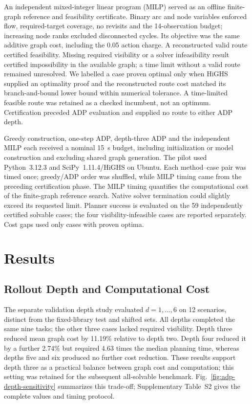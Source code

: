 \documentclass{IEEEtaes}
\newcommand{\unit}[2]{#1~#2}
\begin{document}
An independent mixed-integer linear program (MILP) served as an offline finite-graph reference and feasibility certificate. Binary arc and node variables enforced flow, required-target coverage, no revisits and the 14-observation budget; increasing node ranks excluded disconnected cycles. Its objective was the same additive graph cost, including the 0.05 action charge. A reconstructed valid route certified feasibility. Missing required visibility or a solver infeasibility result certified impossibility in the available graph; a time limit without a valid route remained unresolved. We labelled a case proven optimal only when HiGHS supplied an optimality proof and the reconstructed route cost matched its branch-and-bound lower bound within numerical tolerance. A time-limited feasible route was retained as a checked incumbent, not an optimum. Certification preceded ADP evaluation and supplied no route to either ADP depth.

Greedy construction, one-step ADP, depth-three ADP and the independent MILP each received a nominal \unit{15}{s} budget, including initialization or model construction and excluding shared graph generation. The pilot used Python~3.12.3 and SciPy~1.11.4/HiGHS on Ubuntu. Each method--case pair was timed once; greedy/ADP order was shuffled, while MILP timing came from the preceding certification phase. The MILP timing quantifies the computational cost of the finite-graph reference search. Native solver termination could slightly exceed its requested limit. Planner success is evaluated on the 59 independently certified solvable cases; the four visibility-infeasible cases are reported separately. Cost gaps used only cases with proven optima.

\section{Results}
\label{sec:results}

\subsection{Rollout Depth and Computational Cost}
\label{sec:depth-diagnostic}

The separate validation depth study evaluated $d=1,\ldots,6$ on 12 scenarios, distinct from the fixed-library test and shifted sets. All depths completed the same nine tasks; the other three cases lacked required visibility. Depth three reduced mean graph cost by 11.19\% relative to depth two. Depth four reduced it by a further 2.74\% but required 4.63 times the median planning time, whereas depths five and six produced no further cost reduction. These results support depth three as a practical balance between graph cost and computation; this setting was retained for the subsequent all-solvable benchmark. Fig.~\ref{fig:adp-depth-sensitivity} summarizes this trade-off; Supplementary Table~S2 gives the complete values and timing protocol.
\end{document}
